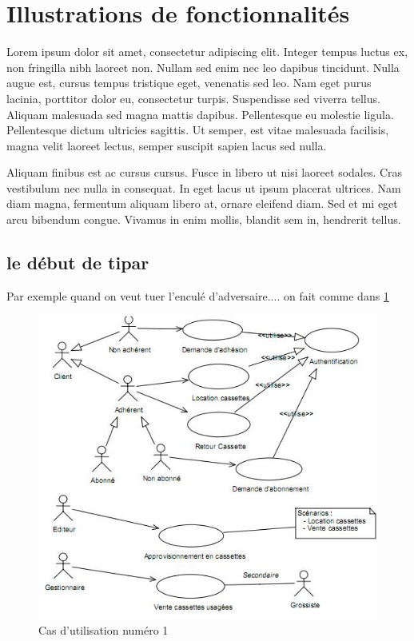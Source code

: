 \section{Illustrations de fonctionnalités }

	Lorem ipsum dolor sit amet, consectetur adipiscing elit. Integer tempus luctus ex, non fringilla nibh laoreet non. Nullam sed enim nec leo dapibus tincidunt. Nulla augue est, cursus tempus tristique eget, venenatis sed leo. Nam eget purus lacinia, porttitor dolor eu, consectetur turpis. Suspendisse sed viverra tellus. Aliquam malesuada sed magna mattis dapibus. Pellentesque eu molestie ligula. Pellentesque dictum ultricies sagittis. Ut semper, est vitae malesuada facilisis, magna velit laoreet lectus, semper suscipit sapien lacus sed nulla.

	Aliquam finibus est ac cursus cursus. Fusce in libero ut nisi laoreet sodales. Cras vestibulum nec nulla in consequat. In eget lacus ut ipsum placerat ultrices. Nam diam magna, fermentum aliquam libero at, ornare eleifend diam. Sed et mi eget arcu bibendum congue. Vivamus in enim mollis, blandit sem in, hendrerit tellus.


	\subsection{le début de tipar }


	Par exemple quand on veut tuer l'enculé d'adversaire.... on fait comme dans  \ref{fig:use1} 

		\begin{figure}
			\begin{center}
				\includegraphics[width=1\textwidth]{figure/cas_utilisation_1.png}
			\end{center}
			\caption{Cas d'utilisation numéro 1}
			\label{fig:use1}
		\end{figure}

